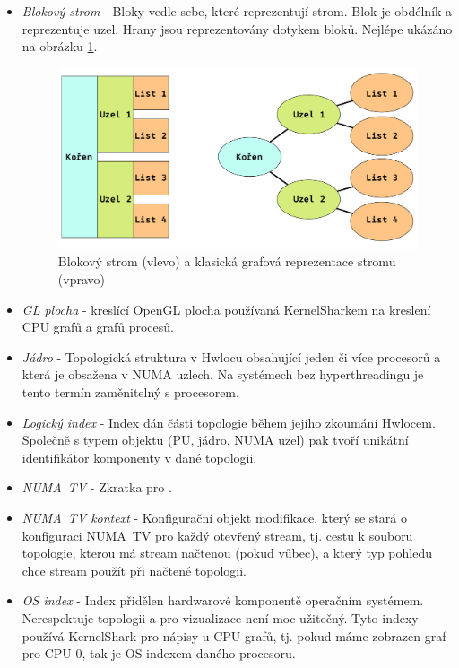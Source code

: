 \begin{itemize}
    \item \emph{Blokový strom} - Bloky vedle sebe, které reprezentují strom. Blok je obdélník a reprezentuje uzel. Hrany jsou reprezentovány dotykem bloků. Nejlépe ukázáno na obrázku \ref{block-tree}.
    \begin{figure}[p]\centering
        \includegraphics[width=140mm]{img/NUMATV/block-tree.pdf}
        \caption{Blokový strom (vlevo) a klasická grafová reprezentace stromu (vpravo)}
        \label{block-tree}
    \end{figure}
    \item \emph{GL plocha} - kreslící OpenGL plocha používaná KernelSharkem na kreslení CPU grafů a grafů procesů.
    \item \emph{Jádro} - Topologická struktura v Hwlocu obsahující jeden či více procesorů a která je obsažena v NUMA uzlech. Na systémech bez hyperthreadingu je tento termín zaměnitelný s procesorem.
    \item \emph{Logický index} - Index dán části topologie během jejího zkoumání Hwlocem. Společně s typem objektu (PU, jádro, NUMA uzel) pak tvoří unikátní identifikátor komponenty v dané topologii.
    \item \emph{NUMA~TV} - Zkratka pro .
    \item \emph{NUMA~TV kontext} - Konfigurační objekt modifikace, který se stará o konfiguraci NUMA~TV pro každý otevřený stream, tj. cestu k souboru topologie, kterou má stream načtenou (pokud vůbec), a který typ pohledu chce stream použít při načtené topologii.
    \item \emph{OS index} - Index přidělen hardwarové komponentě operačním systémem. Nerespektuje topologii a pro vizualizace není moc užitečný. Tyto indexy používá KernelShark pro nápisy u CPU grafů, tj. pokud máme zobrazen graf pro CPU 0, tak  je OS indexem daného procesoru.

\end{itemize}
